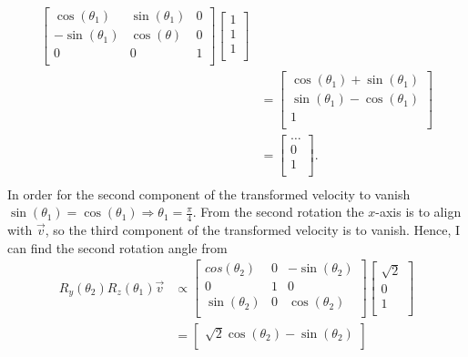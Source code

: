 \begin{example}
\begin{enumerate}
\begin{equation}
\begin{split}
\begin{bmatrix}
					\cos(\theta_1) & \sin(\theta_1) & 0 \\
					-\sin(\theta_1) & \cos(\theta) & 0 \\
					0 & 0 & 1 \\
				\end{bmatrix}\begin{bmatrix}
					1\\
					1\\
					1\\
				\end{bmatrix}\\
				&=\begin{bmatrix}
					\cos(\theta_1)+\sin(\theta_1)\\
					\sin(\theta_1)-\cos(\theta_1)\\
					1\\
				\end{bmatrix}\\
				&= \begin{bmatrix}
					\dots\\
					0\\
					1\\
				\end{bmatrix}.\\
			\end{split}
		\end{equation} 
		In order for the second component of the transformed velocity to vanish $\sin(\theta_1)=\cos(\theta_1)\Rightarrow \theta_1=\frac{\pi}{4}$. From the second rotation the $x$-axis is to align with $\vec{v}$, so the third component of the transformed velocity is to vanish. Hence, I can find the second rotation angle from
		\begin{equation}
			\begin{split}
				R_y(\theta_2)R_z(\theta_1)\vec{v}&\propto
				\begin{bmatrix}
					cos(\theta_2) & 0 & -\sin(\theta_2) \\
					0 & 1 & 0 \\
					\sin(\theta_2) & 0 & \cos(\theta_2) \\
				\end{bmatrix}\begin{bmatrix}
					\sqrt{2}\\
					0\\
					1\\
				\end{bmatrix}\\
				&=\begin{bmatrix}
					\sqrt{2}\cos(\theta_2)-\sin(\theta_2)\\

\end{bmatrix}
\end{split}
\end{equation}
\end{enumerate}
\end{example}
